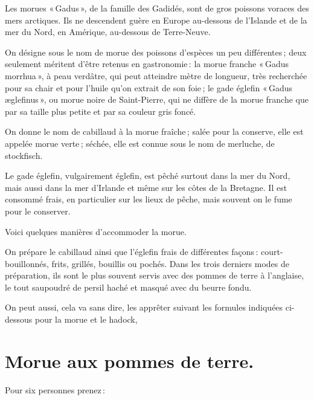 Les morues « Gadus », de la famille des Gadidés, sont de gros poissons voraces
des mers arctiques. Ils ne descendent guère en Europe au-dessous de l'Islande
et de la mer du Nord, en Amérique, au-dessous de Terre-Neuve.

On désigne sous le nom de morue des poissons d'espèces un peu différentes ;
deux seulement méritent d'être retenus en gastronomie : la morue franche « Gadus
morrhua », à peau verdâtre, qui peut atteindre {\mmm} mètre de longueur, très
recherchée pour sa chair et pour l'huile qu'on extrait de son foie ; le gade églefin
« Gadus æglefinus », ou morue noire de Saint-Pierre, qui ne diffère de la morue
franche que par sa taille plus petite et par sa couleur gris foncé.

\sk

On donne le nom de cabillaud à la morue fraîche ; salée pour la conserve, elle
est appelée morue verte ; séchée, elle est connue sous le nom de merluche, de
stockfisch.

\sk

Le gade églefin, vulgairement églefin, est pêché surtout dans la mer du Nord,
mais aussi dans la mer d'Irlande et même sur les côtes de la Bretagne. Il est
consommé frais, en particulier sur les lieux de pêche, mais souvent on le fume
pour le conserver.

\sk

Voici quelques manières d'accommoder la morue.

On prépare le cabillaud ainsi que l'églefin frais de différentes façons :
court-bouillonnés, frits, grillés, bouillis ou pochés. Dans les trois derniers
modes de préparation, ils sont le plus souvent servis avec des pommes de terre
à l'anglaise, le tout saupoudré de persil haché et masqué avec du beurre fondu.

\sk

On peut aussi, cela va sans dire, les apprêter suivant les formules indiquées
ci-dessous pour la morue et le hadock,

\section*{\centering Morue aux pommes de terre.}

Pour six personnes prenez :

\medskip

